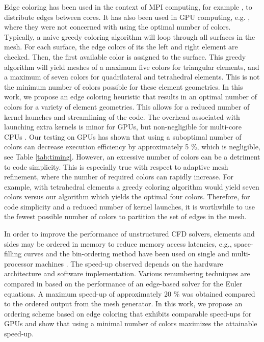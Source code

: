 \documentclass[12pt]{article}
\begin{document}
Edge coloring has been used in the context of MPI computing, for example \cite{lohner2008applied}, to distribute edges between cores.  It has also been used in GPU computing, e.g. \cite{luo,komatitsch}, where they were not concerned with using the optimal number of colors.  Typically, a naive greedy coloring algorithm will loop through all surfaces in the mesh.   For each surface, the edge colors of its the left and right element are checked.  Then, the first available color is assigned to the surface.  This greedy algorithm will yield meshes of a maximum five colors for triangular elements, and a maximum of seven colors for quadrilateral and tetrahedral elements.  This is not the minimum number of colors possible for these element geometries.  In this work, we propose an edge coloring heuristic that results in an optimal number of colors for a variety of element geometries.  This allows for a reduced number of kernel launches and streamlining of the code.  The overhead associated with launching extra kernels is minor for GPUs, but non-negligible for multi-core CPUs \cite{luo}.  Our testing on GPUs has shown that using a suboptimal number of colors can decrease execution efficiency by approximately 5 \%, which is negligible, see Table \ref{tab:timing}.  However, an excessive number of colors can be a detriment to code simplicity.  This is especially true with respect to adaptive mesh refinement, where the number of required colors can rapidly increase.  For example, with tetrahedral elements a greedy coloring algorithm would yield seven colors versus our algorithm which yields the optimal four colors.  Therefore, for code simplicity and a reduced number of kernel launches, it is worthwhile to use the fewest possible number of colors to partition the set of edges in the mesh.   

In order to improve the performance of unstructured CFD solvers, elements and sides may be ordered in memory to reduce memory access latencies, e.g., space-filling curves and the bin-ordering method have been used on single and multi-processor machines \cite{lohner2008applied, marsha,corrigan}.  The speed-up observed depends on the hardware architecture \cite{lohner2008applied} and software implementation.  Various renumbering techniques are compared in \cite{burgess} based on the performance of an edge-based solver for the Euler equations.   A maximum speed-up of approximately 20 \% was obtained compared to the ordered output from the mesh generator.  In this work, we propose an ordering scheme based on edge coloring that exhibits comparable speed-ups for GPUs and show that using a minimal number of colors maximizes the attainable speed-up.
\end{document}
